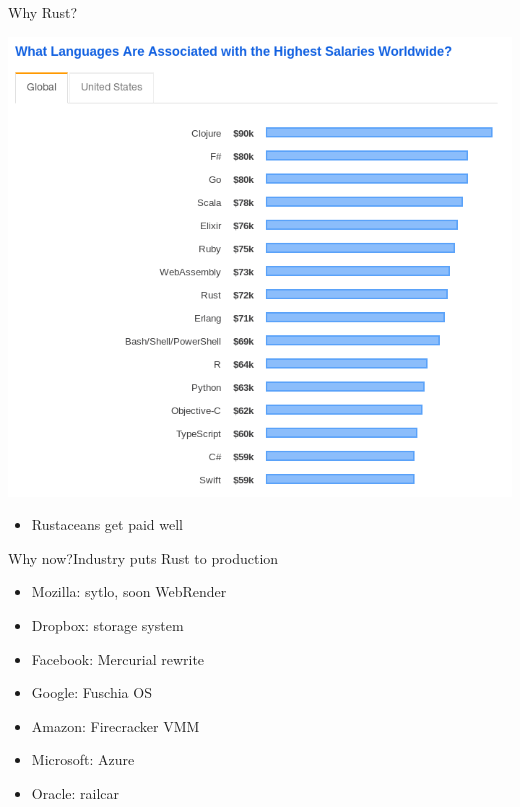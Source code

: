 \documentclass[aspectratio=169]{beamer}
\begin{document}
\begin{frame}[c]{Why Rust?}{}

  \includegraphics[width=.5\linewidth]{figs/screenshots/presentation-20190614-135255}

  \begin{itemize}
  \item Rustaceans get paid well
  \end{itemize}
\end{frame}


\begin{frame}[c]{Why now?}{Industry puts Rust to production}

  \begin{itemize}
  \item Mozilla: sytlo, soon WebRender
  \item Dropbox: storage system
  \item Facebook: Mercurial rewrite
  \item Google: Fuschia OS
  \item Amazon: Firecracker VMM
  \item Microsoft: Azure
  \item Oracle: railcar
  \end{itemize}
\end{frame}
\end{document}
